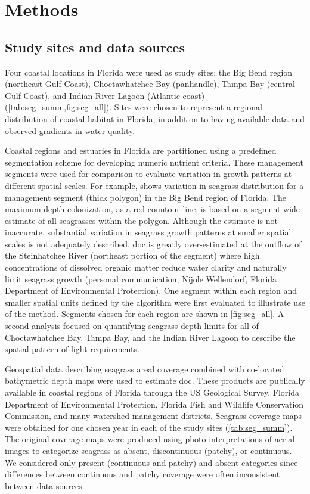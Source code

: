 \documentclass[letterpaper,12pt,oneside]{article}\usepackage[]{graphicx}\usepackage[]{color}
\begin{document}
\section{Methods}

\subsection{Study sites and data sources} \label{sec:data_srcs}

Four coastal locations in Florida were used as study sites: the Big Bend region (northeast Gulf Coast), Choctawhatchee Bay (panhandle), Tampa Bay (central Gulf Coast), and Indian River Lagoon (Atlantic coast) (\cref{tab:seg_summ,fig:seg_all}).  Sites were chosen to represent a regional distribution of coastal habitat in Florida, in addition to having available data and observed gradients in water quality. 

Coastal regions and estuaries in Florida are partitioned using a predefined segmentation scheme for developing numeric nutrient criteria.  These management segments were used for comparison to evaluate variation in growth patterns at different spatial scales.  For example,  shows variation in seagrass distribution for a management segment (thick polygon) in the Big Bend region of Florida.  The maximum depth colonization, as a red countour line, is based on a segment-wide estimate of all seagrasses within the polygon.  Although the estimate is not inaccurate, substantial variation in seagrass growth patterns at smaller spatial scales is not adequately described.  \ac{doc} is greatly over-estimated at the outflow of the Steinhatchee River (northeast portion of the segment) where high concentrations of dissolved organic matter reduce water clarity and naturally limit seagrass growth (personal communication, Nijole Wellendorf, Florida Department of Environmental Protection).  One segment within each region and smaller spatial units defined by the algorithm were first evaluated to illustrate use of the method.  Segments chosen for each region are shown in \cref{fig:seg_all}. A second analysis focused on quantifying seagrass depth limits for all of Choctawhatchee Bay, Tampa Bay, and the Indian River Lagoon to describe the spatial pattern of light requirements.

Geospatial data describing seagrass areal coverage combined with co-located bathymetric depth maps were used to estimate \ac{doc}.  These products are publically available in coastal regions of Florida through the US Geological Survey, Florida Department of Environmental Protection, Florida Fish and Wildlife Conservation Commission, and many watershed management districts.  Seagrass coverage maps were obtained for one chosen year in each of the study sites (\cref{tab:seg_summ}).  The original coverage maps were produced using photo-interpretations of aerial images to categorize seagrass as absent, discontinuous (patchy), or continuous.  We considered only present (continuous and patchy) and absent categories since differences between continuous and patchy coverage were often inconsistent between data sources. 
\end{document}
